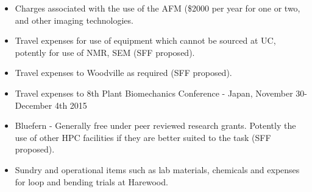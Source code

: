 \begin{itemize}
\item Charges associated with the use of the AFM (\$2000 per year for one or two, and other imaging technologies.
\end{itemize}

\begin{itemize}
\item Travel expenses for use of equipment which cannot be sourced at UC, potently for
use of NMR, SEM (SFF proposed).
\end{itemize}

\begin{itemize}
\item Travel expenses to Woodville as required (SFF proposed).
\end{itemize}
\begin{itemize}
\item Travel expenses to 8th Plant Biomechanics Conference - Japan, November
30-December 4th 2015
\end{itemize}

\begin{itemize}
\item Bluefern - Generally free under peer reviewed research grants. Potently the use
of other HPC facilities if they are better suited to the task (SFF proposed).
\end{itemize}

\begin{itemize}
\item Sundry and operational items such as lab materials, chemicals and expenses for
loop and bending trials at Harewood.
\end{itemize}
